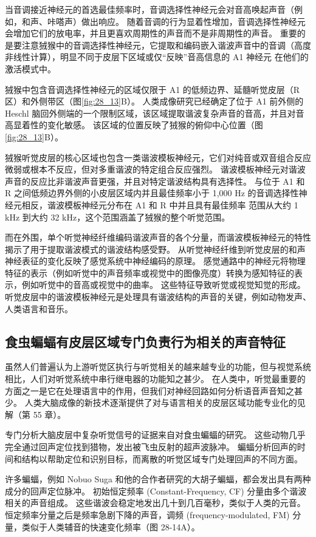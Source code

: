 当音调接近神经元的首选最佳频率时，音调选择性神经元会对音高唤起声音（例如，和声、咔嗒声）做出响应。 
随着音调的行为显着性增加，音调选择性神经元会增加它们的放电率，并且更喜欢周期性的声音而不是非周期性的声音。 
重要的是要注意狨猴中的音调选择性神经元，它提取和编码嵌入谐波声音中的音调（高度非线性计算），明显不同于皮层下区域或仅“反映”音高信息的 A1 神经元 在他们的激活模式中。

狨猴中包含音调选择性神经元的区域仅限于 A1 的低频边界、延髓听觉皮层（R 区）和外侧带区（图\ref{fig:28_13}B）。 
人类成像研究已经确定了位于 A1 前外侧的 Heschl 脑回外侧端的一个限制区域，该区域提取谐波复杂声音的音高，并且对音高显着性的变化敏感。 
该区域的位置反映了狨猴的俯仰中心位置（图\ref{fig:28_13}B）。


狨猴听觉皮层的核心区域也包含一类谐波模板神经元，它们对纯音或双音组合反应微弱或根本不反应，但对多重谐波的特定组合反应强烈。 
谐波模板神经元对谐波声音的反应比非谐波声音更强，并且对特定谐波结构具有选择性。 
与位于 A1 和 R 之间低频边界外侧的小皮层区域内并且最佳频率小于 1,000 Hz 的音调选择性神经元相反，谐波模板神经元分布在 A1 和 R 中并且具有最佳频率 范围从大约 1 kHz 到大约 32 kHz，这个范围涵盖了狨猴的整个听觉范围。


而在外围，单个听觉神经纤维编码谐波声音的各个分量，而谐波模板神经元的特性揭示了用于提取谐波模式的谐波结构感受野。 
从听觉神经纤维到听觉皮层的和声神经表征的变化反映了感觉系统中神经编码的原理。 
感觉通路中的神经元将物理特征的表示（例如听觉中的声音频率或视觉中的图像亮度）转换为感知特征的表示，例如听觉中的音高或视觉中的曲率。 
这些特征导致听觉或视觉知觉的形成。 
听觉皮层中的谐波模板神经元是处理具有谐波结构的声音的关键，例如动物发声、人类语言和音乐。


\subsection{食虫蝙蝠有皮层区域专门负责行为相关的声音特征}
虽然人们普遍认为上游听觉区执行与听觉相关的越来越专业的功能，但与视觉系统相比，人们对听觉系统中串行继电器的功能知之甚少。 
在人类中，听觉最重要的方面之一是它在处理语言中的作用，但我们对神经回路如何分析语音声音知之甚少。 
人类大脑成像的新技术逐渐提供了对与语言相关的皮层区域功能专业化的见解（第 55 章）。


专门分析大脑皮层中复杂听觉信号的证据来自对食虫蝙蝠的研究。 
这些动物几乎完全通过回声定位找到猎物，发出被飞虫反射的超声波脉冲。 
蝙蝠分析回声的时间和结构以帮助定位和识别目标，而离散的听觉区域专门处理回声的不同方面。


许多蝙蝠，例如 Nobuo Suga 和他的合作者研究的大胡子蝙蝠，都会发出具有两种成分的回声定位脉冲。 
初始恒定频率 (Constant-Frequency, CF) 分量由多个谐波相关的声音组成。 
这些谐波会稳定地发出几十到几百毫秒，类似于人类的元音。 
恒定频率分量之后是频率急剧下降的声音，调频 (frequency-modulated, FM) 分量，类似于人类辅音的快速变化频率（图 28-14A）。


